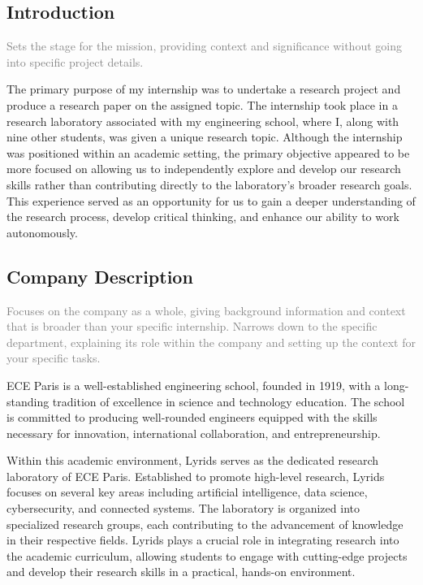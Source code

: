 \subsection{Introduction}\label{subsec:introduction}
\textcolor{gray}
{Sets the stage for the mission, providing context and significance without going into specific project details.}

The primary purpose of my internship was to undertake a research project and produce a research paper on the assigned
topic.
The internship took place in a research laboratory associated with my engineering school, where I, along with
nine other students, was given a unique research topic.
Although the internship was positioned within an academic setting, the primary objective appeared to be more focused on
allowing us to independently explore and develop our research skills rather than contributing directly to the
laboratory's broader research goals.
This experience served as an opportunity for us to gain a deeper understanding of the research process, develop critical
thinking, and enhance our ability to work autonomously.

\subsection{Company Description}\label{subsec:company-description}
\textcolor{gray}
{Focuses on the company as a whole, giving background information and context that is broader than your specific
internship. Narrows down to the specific department,
    explaining its role within the company and setting up the context for your specific tasks.}


ECE Paris is a well-established engineering school, founded in 1919, with a long-standing tradition of excellence in
science and technology education.
The school is committed to producing well-rounded engineers equipped with the skills necessary for innovation,
international collaboration, and entrepreneurship.

Within this academic environment, Lyrids serves as the dedicated research laboratory of ECE Paris.
Established to promote high-level research, Lyrids focuses on several key areas including artificial intelligence, data
science,
cybersecurity, and connected systems.
The laboratory is organized into specialized research groups, each contributing to the advancement of knowledge in their
respective fields.
Lyrids plays a crucial role in integrating research into the academic curriculum, allowing students to engage with
cutting-edge projects and develop their research skills in a practical, hands-on environment.

